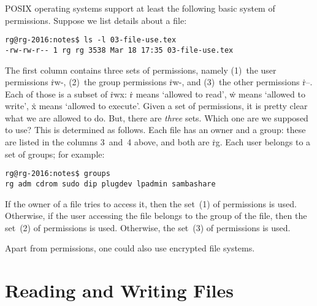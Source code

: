 POSIX operating systems support at least the following basic system of permissions.
Suppose we list details about a file:
\begin{verbatim}
rg@rg-2016:notes$ ls -l 03-file-use.tex
-rw-rw-r-- 1 rg rg 3538 Mar 18 17:35 03-file-use.tex
\end{verbatim}
The first column contains three sets of permissions, namely
  (1)~the user permissions \.{rw-},
  (2)~the group permissions \.{rw-}, and
  (3)~the other permissions \.{r--}.
Each of those is a subset of \.{rwx}:
  \.{r} means `allowed to read',
  \.{w} means `allowed to write',
  \.{x} means `allowed to execute'.
Given a set of permissions, it is pretty clear what we are allowed to do.
But, there are \emph{three} sets.
Which one are we supposed to use?
This is determined as follows.
Each file has an owner and a group:
  these are listed in the columns 3~and~4 above, and both are \.{rg}.
Each user belongs to a set of groups; for example:
\begin{verbatim}
rg@rg-2016:notes$ groups
rg adm cdrom sudo dip plugdev lpadmin sambashare
\end{verbatim}
If the owner of a file tries to access it,
  then the set~(1) of permissions is used.
Otherwise, if the user accessing the file belongs to the group of the file,
  then the set~(2) of permissions is used.
Otherwise, the set~(3) of permissions is used.

\smallskip

Apart from permissions, one could also use encrypted file systems.


\section*{Reading and Writing Files}

